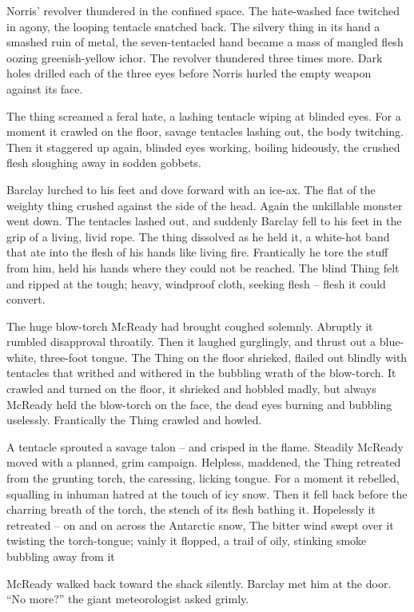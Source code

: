\documentclass[ebook,oneside,11pt]{memoir}				%
\begin{document}
Norris' revolver thundered in the confined space. The hate-washed face twitched in agony, the looping tentacle snatched back. The silvery thing in its hand a smashed ruin of metal, the seven-tentacled hand became a mass of mangled flesh oozing greenish-yellow ichor. The revolver thundered three times more. Dark holes drilled each of the three eyes before Norris hurled the empty weapon against its face.

The thing screamed a feral hate, a lashing tentacle wiping at blinded eyes. For a moment it crawled on the floor, savage tentacles lashing out, the body twitching. Then it staggered up again, blinded eyes working, boiling hideously, the crushed flesh sloughing away in sodden gobbets.

Barclay lurched to his feet and dove forward with an ice-ax. The flat of the weighty thing crushed against the side of the head. Again the unkillable monster went down. The tentacles lashed out, and suddenly Barclay fell to his feet in the grip of a living, livid rope. The thing dissolved as he held it, a white-hot band that ate into the flesh of his hands like living fire. Frantically he tore the stuff from him, held his hands where they could not be reached. The blind Thing felt and ripped at the tough; heavy, windproof cloth, seeking flesh -- flesh it could convert.

The huge blow-torch McReady had brought coughed solemnly. Abruptly it rumbled disapproval throatily. Then it laughed gurglingly, and thrust out a blue-white, three-foot tongue. The Thing on the floor shrieked, flailed out blindly with tentacles that writhed and withered in the bubbling wrath of the blow-torch. It crawled and turned on the floor, it shrieked and hobbled madly, but always McReady held the blow-torch on the face, the dead eyes burning and bubbling uselessly. Frantically the Thing crawled and howled.

A tentacle sprouted a savage talon -- and crisped in the flame. Steadily McReady moved with a planned, grim campaign. Helpless, maddened, the Thing retreated from the grunting torch, the caressing, licking tongue. For a moment it rebelled, squalling in inhuman hatred at the touch of icy snow. Then it fell back before the charring breath of the torch, the stench of its flesh bathing it. Hopelessly it retreated -- on and on across the Antarctic snow, The bitter wind swept over it twisting the torch-tongue; vainly it flopped, a trail of oily, stinking smoke bubbling away from it

McReady walked back toward the shack silently. Barclay met him at the door. ``No more?'' the giant meteorologist asked grimly.
\end{document}
